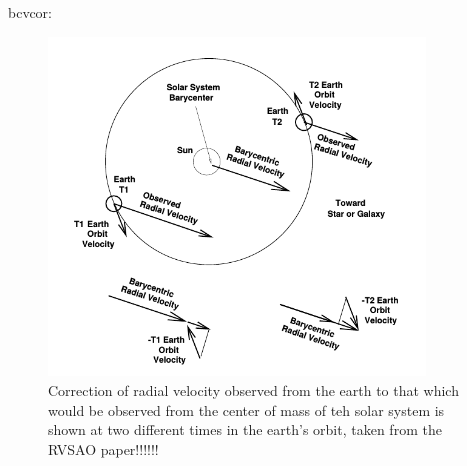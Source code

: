 bcvcor:

\begin{figure}[H]
\centering
\includegraphics[width=10cm]{images/bcvcor.png}
\caption[The nature of the barycenter shift of radial velocities]{Correction of radial velocity observed from the earth to that which would be observed from the center of mass of teh solar system is shown at two different times in the earth's orbit, taken from the RVSAO paper!!!!!!}
\end{figure}
